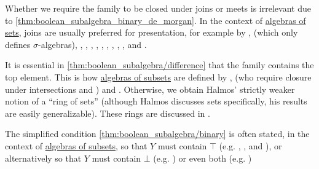\begin{comments}
  \item Whether we require the family to be closed under joins or meets is irrelevant due to \cref{thm:boolean_subalgebra_binary_de_morgan}. In the context of \hyperref[def:algebra_of_subsets]{algebras of sets}, joins are usually preferred for presentation, for example by
  ,
   (which only defines \( \sigma \)-algebras),
  ,
  ,
  ,
  ,
  ,
  ,
  ,
  ,
  ,
   and
  .

  \item It is essential in \cref{thm:boolean_subalgebra/difference} that the family contains the top element. This is how \hyperref[def:algebra_of_subsets]{algebras of subsets} are defined by
  ,
   (who require closure under intersections and ) and
  .
  Otherwise, we obtain Halmos' strictly weaker notion of a \enquote{ring of sets} (although Halmos discusses sets specifically, his results are easily generalizable). These rings are discussed in .

  \item The simplified condition \cref{thm:boolean_subalgebra/binary} is often stated, in the context of \hyperref[def:algebra_of_subsets]{algebras of subsets}, so that \( Y \) must contain \( \top \) (e.g. , ,  and ), or alternatively so that \( Y \) must contain \( \bot \) (e.g. ) or even both (e.g. )
\end{comments}
